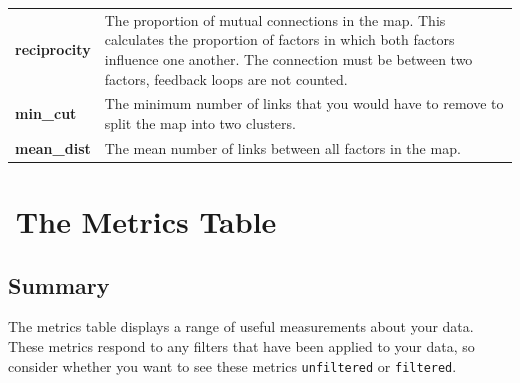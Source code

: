\documentclass[
]{book}
\begin{document}
\begin{longtable}[]{@{}
  >{\raggedright\arraybackslash}p{}
  >{\raggedright\arraybackslash}p{}@{}}
\textbf{reciprocity} & The proportion of mutual connections in the map. This calculates the proportion of factors in which both factors influence one another. The connection must be between two factors, feedback loops are not counted. \\
\textbf{min\_cut} & The minimum number of links that you would have to remove to split the map into two clusters. \\
\textbf{mean\_dist} & The mean number of links between all factors in the map. \\
\bottomrule()
\end{longtable}

\hypertarget{xmetrics}{%
\chapter{🧪The Metrics Table}\label{xmetrics}}

\hypertarget{summary-2}{%
\section{Summary}\label{summary-2}}

The metrics table displays a range of useful measurements about your data. These metrics respond to any filters that have been applied to your data, so consider whether you want to see these metrics \texttt{unfiltered} or \texttt{filtered}.
\end{document}
